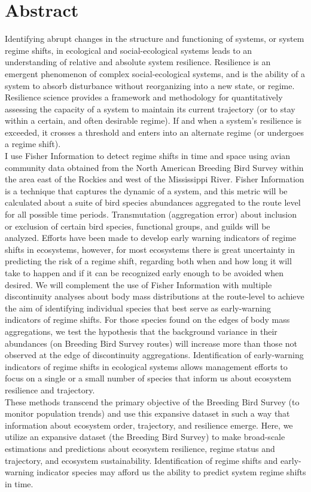 \documentclass[12pt,twoside,openany]{reedthesis}
\begin{document}
\hypertarget{abstract}{%
\chapter*{Abstract}\label{abstract}}

Identifying abrupt changes in the structure and functioning of systems, or system regime shifts, in ecological and social-ecological systems leads to an understanding of relative and absolute system resilience. Resilience is an emergent phenomenon of complex social-ecological systems, and is the ability of a system to absorb disturbance without reorganizing into a new state, or regime. Resilience science provides a framework and methodology for quantitatively assessing the capacity of a system to maintain its current trajectory (or to stay within a certain, and often desirable regime). If and when a system's resilience is exceeded, it crosses a threshold and enters into an alternate regime (or undergoes a regime shift).\\
I use Fisher Information to detect regime shifts in time and space using avian community data obtained from the North American Breeding Bird Survey within the area east of the Rockies and west of the Mississippi River. Fisher Information is a technique that captures the dynamic of a system, and this metric will be calculated about a suite of bird species abundances aggregated to the route level for all possible time periods. Transmutation (aggregation error) about inclusion or exclusion of certain bird species, functional groups, and guilds will be analyzed. Efforts have been made to develop early warning indicators of regime shifts in ecosystems, however, for most ecosystems there is great uncertainty in predicting the risk of a regime shift, regarding both when and how long it will take to happen and if it can be recognized early enough to be avoided when desired. We will complement the use of Fisher Information with multiple discontinuity analyses about body mass distributions at the route-level to achieve the aim of identifying individual species that best serve as early-warning indicators of regime shifts. For those species found on the edges of body mass aggregations, we test the hypothesis that the background variance in their abundances (on Breeding Bird Survey routes) will increase more than those not observed at the edge of discontinuity aggregations. Identification of early-warning indicators of regime shifts in ecological systems allows management efforts to focus on a single or a small number of species that inform us about ecosystem resilience and trajectory.\\
These methods transcend the primary objective of the Breeding Bird Survey (to monitor population trends) and use this expansive dataset in such a way that information about ecosystem order, trajectory, and resilience emerge. Here, we utilize an expansive dataset (the Breeding Bird Survey) to make broad-scale estimations and predictions about ecosystem resilience, regime status and trajectory, and ecosystem sustainability. Identification of regime shifts and early-warning indicator species may afford us the ability to predict system regime shifts in time.
\end{document}
